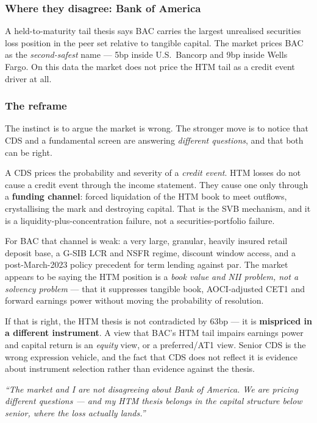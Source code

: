 \documentclass[11pt,a4paper]{article}
\newcommand{\keypoint}[1]{%
  \par\vspace{0.4em}\noindent
  \colorbox{codebg}{\parbox{\dimexpr\linewidth-2\fboxsep}{\small #1}}%
  \par\vspace{0.5em}}
\begin{document}
\subsubsection*{Where they disagree: Bank of America}

A held-to-maturity tail thesis says BAC carries the largest unrealised securities loss position
in the peer set relative to tangible capital. The market prices BAC as the \emph{second-safest}
name --- 5bp inside U.S.\ Bancorp and 9bp inside Wells Fargo. On this data the market does not
price the HTM tail as a credit event driver at all.

\subsubsection*{The reframe}

The instinct is to argue the market is wrong. The stronger move is to notice that CDS and a
fundamental screen are answering \emph{different questions}, and that both can be right.

A CDS prices the probability and severity of a \emph{credit event}. HTM losses do not cause a
credit event through the income statement. They cause one only through a \textbf{funding
channel}: forced liquidation of the HTM book to meet outflows, crystallising the mark and
destroying capital. That is the SVB mechanism, and it is a liquidity-plus-concentration
failure, not a securities-portfolio failure.

For BAC that channel is weak: a very large, granular, heavily insured retail deposit base, a
G-SIB LCR and NSFR regime, discount window access, and a post-March-2023 policy precedent for
term lending against par. The market appears to be saying the HTM position is a \emph{book
value and NII problem, not a solvency problem} --- that it suppresses tangible book,
AOCI-adjusted CET1 and forward earnings power without moving the probability of resolution.

\keypoint{If that is right, the HTM thesis is not contradicted by 63bp --- it is
\textbf{mispriced in a different instrument}. A view that BAC's HTM tail impairs earnings power
and capital return is an \emph{equity} view, or a preferred/AT1 view. Senior CDS is the wrong
expression vehicle, and the fact that CDS does not reflect it is evidence about instrument
selection rather than evidence against the thesis.

\medskip
\emph{``The market and I are not disagreeing about Bank of America. We are pricing different
questions --- and my HTM thesis belongs in the capital structure below senior, where the loss
actually lands.''}}
\end{document}

